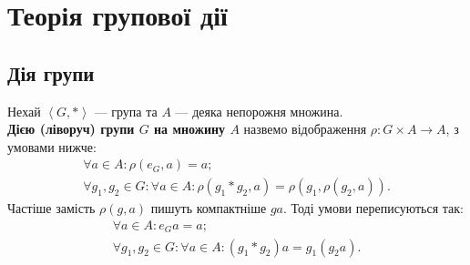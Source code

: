 \documentclass{math_library}
\begin{document}
\iffalse
\begin{proof}
Установимо відображення $\varphi \colon G/_N \to G/_M$ таким чином: $g*N \mapsto g*M$.\\
Доведемо, що $\varphi$ є коректно визначеною функцією. Тому що дійсно, якщо є $g_1*N = g_2*N$, тоді $\varphi(g_1*N) = g_1*M$ та $\varphi(g_2*N) = g_2*M$ -- передали, по суті, один аргумент, а чи отримали одне й те саме, під питанням.\\
Оскільки $g_1*N = g_2*N$, то звідси $g_1*g_2^{-1} \in N$, але тоді $g_1*g_2^{-1} \in M$, тобто $g_1*M = g_2*M$. Отже, $\varphi(g_1*N) = \varphi(g_2*N)$.\\
$\varphi$ -- гомоморфізм, і це неважко:\\
$\varphi((g_1*N)*(g_2*N)) = \varphi((g_1*g_2)*N) = (g_1*g_2)*M = (g_1*M)*(g_2*M) = \varphi(g_1*N) * \varphi(g_2*N)$.\\
$\varphi$ -- сюр'єктивне відображення, бо якщо $g*M \in G/_M$, то тоді завжди можна знайти $g*N \in G/_N$, щоб $\varphi(g*N) = g*M$. Отже $\Im \varphi = G/_M$.\\
Нехай $g*N \in \ker \varphi$, або $\varphi(g*N) = e*M \iff g*M = M \iff \\ g \in M \iff g*N \in M/_N$, оскільки $g \in M$. Отже, $\ker \varphi = M/_N$.\\
За першою теоремою, про ізоморфізм, отримали ${G/_N}/_{M/_N} \cong G/_M$.
\end{proof}
\fi
\newpage


\section{Теорія групової дії}
\subsection{Дія групи}
\begin{definition}
Нехай $\left< G,*\right>$ --- група та $A$ --- деяка непорожня множина.\\
\textbf{Дією (ліворуч) групи $G$ на множину $A$} назвемо відображення $\rho \colon G \times A \to A$, з умовами нижче:
\begin{align*}
\forall a \in A: \rho(e_G,a) = a; \\
\forall g_1,g_2 \in G: \forall a \in A: \rho(g_1*g_2,a) = \rho(g_1,\rho(g_2,a)).
\end{align*}
Частіше замість $\rho(g,a)$ пишуть компактніше $ga$. Тоді умови переписуються так:
\begin{align*}
\forall a \in A: e_G a = a; \\
\forall g_1,g_2 \in G: \forall a \in A: (g_1 * g_2)a = g_1(g_2a).
\end{align*} 
\end{definition}
\end{document}
